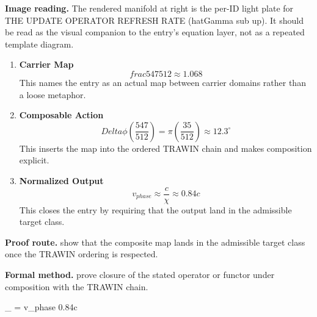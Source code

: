 \begin{samepage}
\noindent\begin{minipage}[t]{0.45\linewidth}
\vspace{0pt}
\raggedright
\scriptsize\textbf{Image reading.} The rendered manifold at right is the per-ID light plate for THE UPDATE OPERATOR REFRESH RATE (hatGamma sub up). It should be read as the visual companion to the entry's equation layer, not as a repeated template diagram.\par
\end{minipage}\hfill
\begin{minipage}[t]{0.53\linewidth}
\vspace*{-0.10in}
\raggedright
{}
\end{minipage}
\end{samepage}

\clearpage


\begin{enumerate}[leftmargin=1.6em,itemsep=9pt,topsep=6pt]
\item \textbf{Carrier Map}
\[
frac{547}{512} \approx 1.068
\]
This names the entry as an actual map between carrier domains rather than a loose metaphor.

\item \textbf{Composable Action}
\[
Delta\phi\left(\frac{547}{512}\right) = \pi\left(\frac{35}{512}\right) \approx 12.3^\circ
\]
This inserts the map into the ordered TRAWIN chain and makes composition explicit.

\item \textbf{Normalized Output}
\[
v_{phase} \approx \frac{c}{\chi} \approx 0.84c
\]
This closes the entry by requiring that the output land in the admissible target class.
\end{enumerate}

\textbf{Proof route.} show that the composite map lands in the admissible target class once the TRAWIN ordering is respected.

\textbf{Formal method.} prove closure of the stated operator or functor under composition with the TRAWIN chain.

\medskip
{}

\begin{tzpsnapshot}
\end{tzpsnapshot}

\tzpequationlinks
  { \to {}}
  {_{} = \cdots}
  {v_{phase} \approx {} \approx 0.84c}
